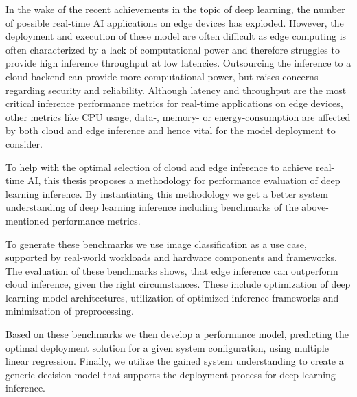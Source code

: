 \noindent In the wake of the recent achievements in the topic of deep learning, the number of possible real-time AI applications on edge devices has exploded.
However, the deployment and execution of these model are often difficult as edge computing is often characterized by a lack of computational power and therefore struggles to provide high inference throughput at low latencies.
Outsourcing the inference to a cloud-backend can provide more computational power, but raises concerns regarding security and reliability. 
Although latency and throughput are the most critical inference performance metrics for real-time applications on edge devices, other metrics like CPU usage, data-, memory- or energy-consumption are affected by both cloud and edge inference and hence vital for the model deployment to consider.

To help with the optimal selection of cloud and edge inference to achieve real-time AI, this thesis proposes a methodology for performance evaluation of deep learning inference.
By instantiating this methodology we get a better system understanding of deep learning inference including benchmarks of the above-mentioned performance metrics.

To generate these benchmarks we use image classification as a use case, supported by real-world workloads and hardware components and frameworks.
The evaluation of these benchmarks shows, that edge inference can outperform cloud inference, given the right circumstances.
These include optimization of deep learning model architectures, utilization of optimized inference frameworks and minimization of preprocessing.


Based on these benchmarks we then develop a performance model, predicting the optimal deployment solution for a given system configuration, using multiple linear regression.
Finally, we utilize the gained system understanding to create a generic decision model that supports the deployment process for deep learning inference.




